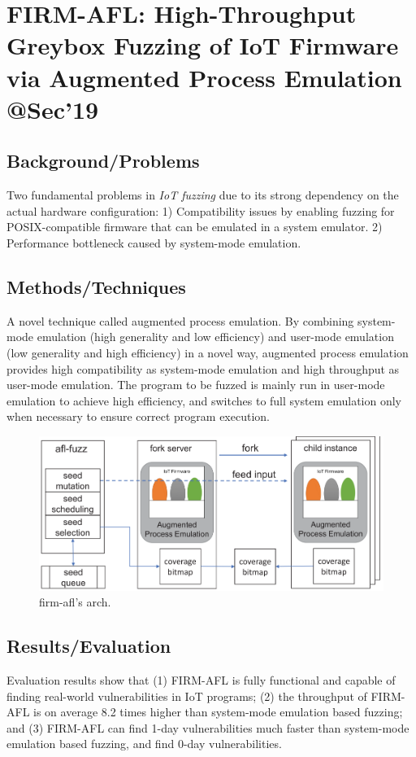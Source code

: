 \section{FIRM-AFL: High-Throughput Greybox Fuzzing of IoT Firmware via Augmented Process Emulation @Sec'19}
\subsection{Background/Problems}
Two fundamental problems in \emph{IoT fuzzing} due to its strong dependency on the actual hardware configuration: 1) Compatibility issues by enabling fuzzing for POSIX-compatible firmware that can be emulated in a system emulator. 2) Performance bottleneck caused by system-mode emulation. 
\subsection{Methods/Techniques}
A novel technique called augmented process emulation. By combining system-mode emulation  (high generality and low efficiency)  and user-mode emulation  (low generality and high efficiency) in a novel way, augmented process emulation provides high compatibility as system-mode emulation and high throughput as user-mode emulation.  The program to be fuzzed is mainly run in user-mode emulation to achieve high efficiency, and switches to full system emulation only when necessary to ensure correct program execution. 
\begin{figure}[h]
    \centering
    \includegraphics[width=\linewidth]{firm-afl.png} %
    \caption{firm-afl's arch.}	
    \label{fig:firmafl}
\end{figure}
\subsection{Results/Evaluation}
Evaluation results show that (1) FIRM-AFL is fully functional and capable of finding real-world vulnerabilities in IoT programs; (2) the throughput of FIRM-AFL is on average 8.2 times higher than system-mode emulation based fuzzing; and (3) FIRM-AFL can find 1-day vulnerabilities much faster than system-mode emulation based fuzzing, and find 0-day vulnerabilities.

